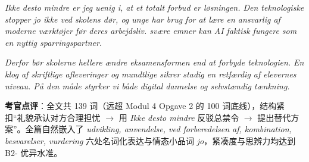 \begin{answerbox}
\textit{Ikke desto mindre er jeg uenig i, at et totalt forbud er løsningen. Den teknologiske  stopper jo ikke ved skolens dør, og unge har brug for at lære en ansvarlig  af moderne værktøjer før deres arbejdsliv.  svære emner kan AI faktisk fungere som en nyttig sparringspartner.}

\textit{Derfor bør skolerne hellere ændre eksamensformen end at forbyde teknologien. En klog  af skriftlige afleveringer og mundtlige  sikrer stadig en retfærdig  af elevernes niveau. På den måde styrker vi både digital dannelse og selvstændig tænkning.}

\small\textbf{考官点评}：全文共 139 词（远超 Modul 4 Opgave 2 的 100 词底线），结构紧扣“礼貌承认对方合理担忧 $\rightarrow$ 用 \textit{Ikke desto mindre} 反驳总禁令 $\rightarrow$ 提出替代方案”。全篇自然嵌入了 \textit{udvikling, anvendelse, ved forberedelsen af, kombination, besvarelser, vurdering} 六处名词化表达与情态小品词 \textit{jo}，紧凑度与思辨力均达到 B2- 优异水准。
\end{answerbox}
